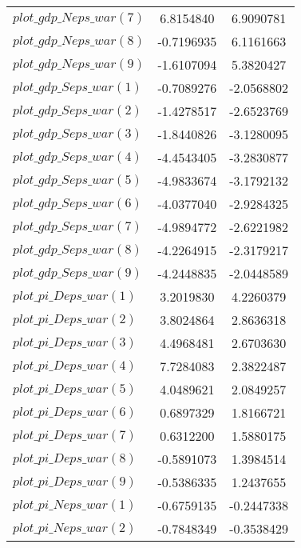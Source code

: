 \begin{center}
\begin{longtable}{lcc}
$plot\_gdp\_N eps\_war (7)  $	 & 	      6.8154840	 & 	      6.9090781 \\ 
$plot\_gdp\_N eps\_war (8)  $	 & 	     -0.7196935	 & 	      6.1161663 \\ 
$plot\_gdp\_N eps\_war (9)  $	 & 	     -1.6107094	 & 	      5.3820427 \\ 
$plot\_gdp\_S eps\_war (1)  $	 & 	     -0.7089276	 & 	     -2.0568802 \\ 
$plot\_gdp\_S eps\_war (2)  $	 & 	     -1.4278517	 & 	     -2.6523769 \\ 
$plot\_gdp\_S eps\_war (3)  $	 & 	     -1.8440826	 & 	     -3.1280095 \\ 
$plot\_gdp\_S eps\_war (4)  $	 & 	     -4.4543405	 & 	     -3.2830877 \\ 
$plot\_gdp\_S eps\_war (5)  $	 & 	     -4.9833674	 & 	     -3.1792132 \\ 
$plot\_gdp\_S eps\_war (6)  $	 & 	     -4.0377040	 & 	     -2.9284325 \\ 
$plot\_gdp\_S eps\_war (7)  $	 & 	     -4.9894772	 & 	     -2.6221982 \\ 
$plot\_gdp\_S eps\_war (8)  $	 & 	     -4.2264915	 & 	     -2.3179217 \\ 
$plot\_gdp\_S eps\_war (9)  $	 & 	     -4.2448835	 & 	     -2.0448589 \\ 
$plot\_pi\_D eps\_war (1)   $	 & 	      3.2019830	 & 	      4.2260379 \\ 
$plot\_pi\_D eps\_war (2)   $	 & 	      3.8024864	 & 	      2.8636318 \\ 
$plot\_pi\_D eps\_war (3)   $	 & 	      4.4968481	 & 	      2.6703630 \\ 
$plot\_pi\_D eps\_war (4)   $	 & 	      7.7284083	 & 	      2.3822487 \\ 
$plot\_pi\_D eps\_war (5)   $	 & 	      4.0489621	 & 	      2.0849257 \\ 
$plot\_pi\_D eps\_war (6)   $	 & 	      0.6897329	 & 	      1.8166721 \\ 
$plot\_pi\_D eps\_war (7)   $	 & 	      0.6312200	 & 	      1.5880175 \\ 
$plot\_pi\_D eps\_war (8)   $	 & 	     -0.5891073	 & 	      1.3984514 \\ 
$plot\_pi\_D eps\_war (9)   $	 & 	     -0.5386335	 & 	      1.2437655 \\ 
$plot\_pi\_N eps\_war (1)   $	 & 	     -0.6759135	 & 	     -0.2447338 \\ 
$plot\_pi\_N eps\_war (2)   $	 & 	     -0.7848349	 & 	     -0.3538429 \\ 

\end{longtable}
\end{center}
